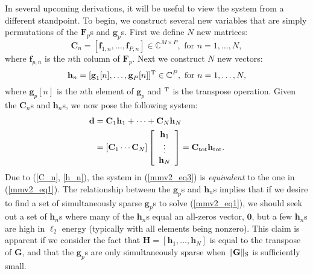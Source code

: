 \documentclass[final]{siamltex}
\newcommand{\field}[1]{\mathbb{#1}}
\newcommand{\la}[1]{\mbox{$\mathbf{#1}$}}  \newcommand{\sst}[1]{\mbox{\scriptsize{#1}}}
\begin{document}
   In several upcoming derivations, it will be useful to view the system
   from a different standpoint.  To begin, we construct several new variables
   that are simply permutations of the $\la{F}_p$s and $\la{g}_p$s.
   First we define $N$ new matrices:
   \begin{equation}\label{C_n}
     \la{C}_n = [ \la{f}_{1,n}, \ldots, \la{f}_{P,n} ]
              \in \field{C}^{M \times P},
              \mbox{ for } n = 1, \ldots, N,
   \end{equation}
   where $\la{f}_{p,n}$ is the $n$th column of $\la{F}_p$.
   Next we construct $N$ new vectors:
   \begin{equation}\label{h_n}
     \la{h}_n = [ \la{g}_1[n], \ldots, \la{g}_P[n] ]^{\sst{T}} 
              \in \field{C}^{P}, \mbox{ for } n = 1, \ldots, N,
   \end{equation}
   where $\la{g}_p[n]$ is the $n$th element of $\la{g}_p$ and
   $^{\sst{T}}$ is the transpose operation.
   Given the $\la{C}_n$s and $\la{h}_n$s, we now pose the
   following system:
   \begin{equation}\label{mmv2_eq3}
   \begin{split}
   \la{d} & = \la{C}_1 \la{h}_1 + \cdots + \la{C}_N \la{h}_N  \\
          & = \left [ \la{C}_1 \cdots \la{C}_N \right ]
                                  \left [ \begin{array}{c}
                                                          \la{h}_1 \\
                                                           \vdots  \\
                                                          \la{h}_N \\
                                          \end{array}
                                  \right ]
          = \la{C}_{\mbox{\scriptsize{tot}}}
            \la{h}_{\mbox{\scriptsize{tot}}}.
   \end{split}
   \end{equation}
   Due to (\ref{C_n}, \ref{h_n}), the system in (\ref{mmv2_eq3}) is 
   {\em{equivalent}} to the one in (\ref{mmv2_eq1}).  The relationship
   between the $\la{g}_p$s and $\la{h}_n$s implies that if we desire
   to find a set of simultaneously sparse $\la{g}_p$s to solve
   (\ref{mmv2_eq1}), we should seek out a set of $\la{h}_n$s where
   many of the $\la{h}_n$s equal an all-zeros vector, \la{0}, but a
   few $\la{h}_n$s are high in $\ell_2$ energy (typically with all
   elements being nonzero).  This claim is apparent if we consider the
   fact that $\la{H} = [\la{h}_1, \ldots, \la{h}_N]$ is equal to the
   transpose of $\la{G}$, and that the $\la{g}_p$s are only 
   simultaneously sparse when $\Vert \la{G}
   \Vert_{\mbox{\scriptsize{S}}}$ is sufficiently small.
\end{document}
